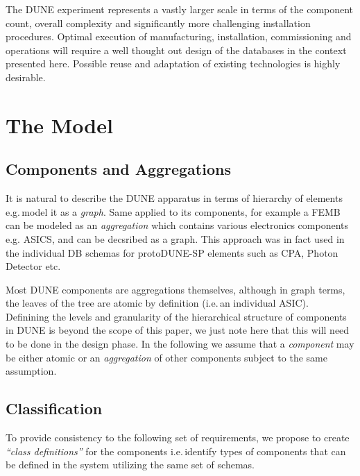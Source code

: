 \documentclass[pdftex,12pt,letter]{article}
\begin{document}
The DUNE experiment represents a vastly larger scale in terms of the component count,
overall complexity and significantly more challenging installation procedures. Optimal execution
of manufacturing, installation, commissioning and operations will require a well thought out design
of the databases in the context presented here. Possible reuse and adaptation of existing technologies
is highly desirable.


\section{The Model}
\subsection{Components and Aggregations}

It is natural to describe the DUNE apparatus in terms of hierarchy of elements e.g.\,model it
as a \textit{graph}. Same applied to its components, for example a FEMB can be modeled as an
\textit{aggregation} which contains various electronics components e.g. ASICS, and can be decsribed as a graph.
This approach was in fact used in the individual DB schemas for protoDUNE-SP elements such as CPA, Photon Detector etc.

Most DUNE components are aggregations themselves, although in graph terms, the leaves of the tree are atomic
by definition (i.e.\,an individual ASIC).  Definining the levels and granularity of the hierarchical structure of components
in DUNE is beyond the scope of this paper, we just note here that this will need to be done in the design phase.
In the following we assume that a \textit{component} may be either atomic or an \textit{aggregation} of other components
subject to the same assumption.

\subsection{Classification}
\label{classification}
To provide consistency to the following set of requirements, we propose to create \textit{``class definitions''} for the components
i.e.\,identify types of components that can be defined in the system utilizing the same set of schemas.
\end{document}
